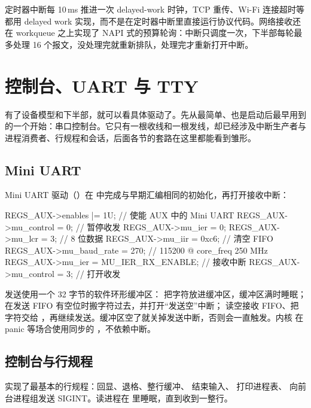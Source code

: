 定时器中断每 10\,ms 推进一次 delayed-work 时钟，TCP 重传、Wi-Fi 连接超时等都用 delayed work 实现，而不是在定时器中断里直接运行协议代码。网络接收还在 workqueue 之上实现了 NAPI 式的预算轮询：中断只调度一次，下半部每轮最多处理 16 个报文，没处理完就重新排队，处理完才重新打开中断。

\section{控制台、UART 与 TTY}

有了设备模型和下半部，就可以看具体驱动了。先从最简单、也是启动后最早用到的一个开始：串口控制台。它只有一根收线和一根发线，却已经涉及中断生产者与进程消费者、行规程和会话，后面各节的套路在这里都能看到雏形。

\subsection{Mini UART}

Mini UART 驱动（）在  中完成与早期汇编相同的初始化，再打开接收中断：

\begin{ccode}
REGS_AUX->enables |= 1U;               // 使能 AUX 中的 Mini UART
REGS_AUX->mu_control = 0;              // 暂停收发
REGS_AUX->mu_ier = 0;
REGS_AUX->mu_lcr = 3;                  // 8 位数据
REGS_AUX->mu_iir = 0xc6;               // 清空 FIFO
REGS_AUX->mu_baud_rate = 270;          // 115200 @ core_freq 250 MHz
REGS_AUX->mu_ier = MU_IER_RX_ENABLE;   // 接收中断
REGS_AUX->mu_control = 3;              // 打开收发
\end{ccode}

发送使用一个 32 字节的软件环形缓冲区： 把字符放进缓冲区，缓冲区满时睡眠； 在发送 FIFO 有空位时搬字符过去，并打开“发送空”中断； 读空接收 FIFO、把字符交给 ，再继续发送。缓冲区空了就关掉发送中断，否则会一直触发。内核  在 panic 等场合使用同步的 ，不依赖中断。

\subsection{控制台与行规程}

 实现了最基本的行规程：回显、退格、整行缓冲、 结束输入、 打印进程表、 向前台进程组发送 SIGINT。读进程在  里睡眠，直到收到一整行。

